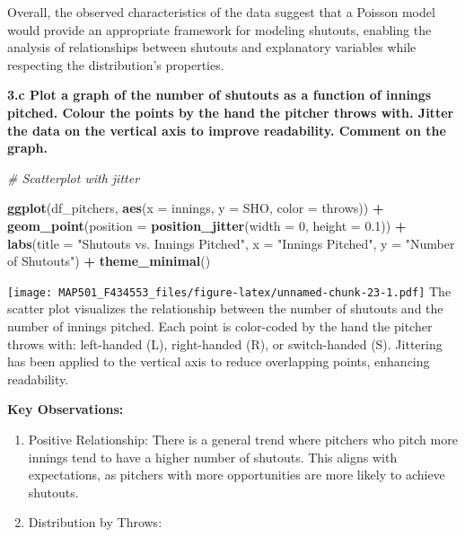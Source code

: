 \documentclass[
]{article}
\newenvironment{Shaded}{\begin{snugshade}}{\end{snugshade}}
\newcommand{\AttributeTok}[1]{\textcolor[rgb]{0.13,0.29,0.53}{#1}}
\newcommand{\CommentTok}[1]{\textcolor[rgb]{0.56,0.35,0.01}{\textit{#1}}}
\newcommand{\DecValTok}[1]{\textcolor[rgb]{0.00,0.00,0.81}{#1}}
\newcommand{\FloatTok}[1]{\textcolor[rgb]{0.00,0.00,0.81}{#1}}
\newcommand{\FunctionTok}[1]{\textcolor[rgb]{0.13,0.29,0.53}{\textbf{#1}}}
\newcommand{\NormalTok}[1]{#1}
\newcommand{\SpecialCharTok}[1]{\textcolor[rgb]{0.81,0.36,0.00}{\textbf{#1}}}
\newcommand{\StringTok}[1]{\textcolor[rgb]{0.31,0.60,0.02}{#1}}
\begin{document}
Overall, the observed characteristics of the data suggest that a Poisson
model would provide an appropriate framework for modeling shutouts,
enabling the analysis of relationships between shutouts and explanatory
variables while respecting the distribution's properties.

\textbf{3.c Plot a graph of the number of shutouts as a function of
innings pitched. Colour the points by the hand the pitcher throws with.
Jitter the data on the vertical axis to improve readability. Comment on
the graph.}

\begin{Shaded}
\begin{Highlighting}[]
\CommentTok{\# Scatterplot with jitter}

\FunctionTok{ggplot}\NormalTok{(df\_pitchers, }\FunctionTok{aes}\NormalTok{(}\AttributeTok{x =}\NormalTok{ innings, }\AttributeTok{y =}\NormalTok{ SHO, }\AttributeTok{color =}\NormalTok{ throws)) }\SpecialCharTok{+}
  \FunctionTok{geom\_point}\NormalTok{(}\AttributeTok{position =} \FunctionTok{position\_jitter}\NormalTok{(}\AttributeTok{width =} \DecValTok{0}\NormalTok{, }\AttributeTok{height =} \FloatTok{0.1}\NormalTok{)) }\SpecialCharTok{+}
  \FunctionTok{labs}\NormalTok{(}\AttributeTok{title =} \StringTok{"Shutouts vs. Innings Pitched"}\NormalTok{,}
       \AttributeTok{x =} \StringTok{"Innings Pitched"}\NormalTok{,}
       \AttributeTok{y =} \StringTok{"Number of Shutouts"}\NormalTok{) }\SpecialCharTok{+}
  \FunctionTok{theme\_minimal}\NormalTok{()}
\end{Highlighting}
\end{Shaded}

\texttt{[image: MAP501\_F434553\_files/figure-latex/unnamed-chunk-23-1.pdf]}
The scatter plot visualizes the relationship between the number of
shutouts and the number of innings pitched. Each point is color-coded by
the hand the pitcher throws with: left-handed (L), right-handed (R), or
switch-handed (S). Jittering has been applied to the vertical axis to
reduce overlapping points, enhancing readability.

\textbf{Key Observations:}

\begin{enumerate}
\def\labelenumi{\arabic{enumi}.}
\item
  Positive Relationship: There is a general trend where pitchers who
  pitch more innings tend to have a higher number of shutouts. This
  aligns with expectations, as pitchers with more opportunities are more
  likely to achieve shutouts.
\item
  Distribution by Throws:
\end{enumerate}
\end{document}
